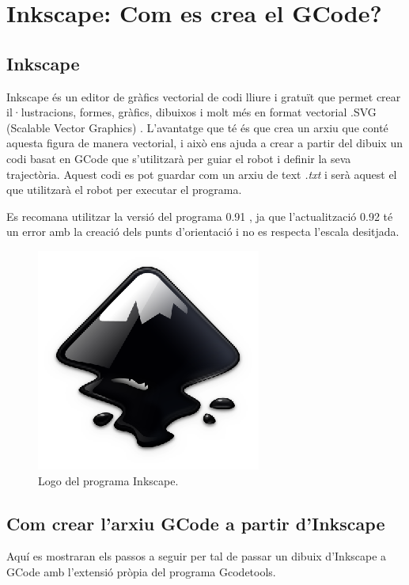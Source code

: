 \section{Inkscape: Com es crea el GCode?}

\subsection{Inkscape}

Inkscape és un editor de gràfics vectorial de codi lliure i gratuït que permet crear il·lustracions, formes, gràfics, dibuixos i molt més en format vectorial .SVG (Scalable Vector Graphics) \cite{InkTutorial}. L'avantatge que té és que crea un arxiu que conté aquesta figura de manera vectorial, i això ens ajuda a crear a partir del dibuix un codi basat en GCode que s'utilitzarà per guiar el robot i definir la seva trajectòria. Aquest codi es pot guardar com un arxiu de text \emph{.txt} i serà aquest el que utilitzarà el robot per executar el programa.

Es recomana utilitzar la versió del programa 0.91 \cite{InkBib}, ja que l'actualització 0.92 té un error amb la creació dels punts d'orientació i no es respecta l'escala desitjada. 

\begin{figure}[H]
	\centering
	\includegraphics[scale=1]{inkscape-logo.eps}
	\caption{Logo del programa Inkscape.}
	\label{fig:inkscapelogo}
\end{figure}

\subsection{Com crear l'arxiu GCode a partir d'Inkscape} \label{sec:ManualInk}

Aquí es mostraran els passos a seguir per tal de passar un dibuix d'Inkscape a GCode amb l'extensió pròpia del programa Gcodetools.

